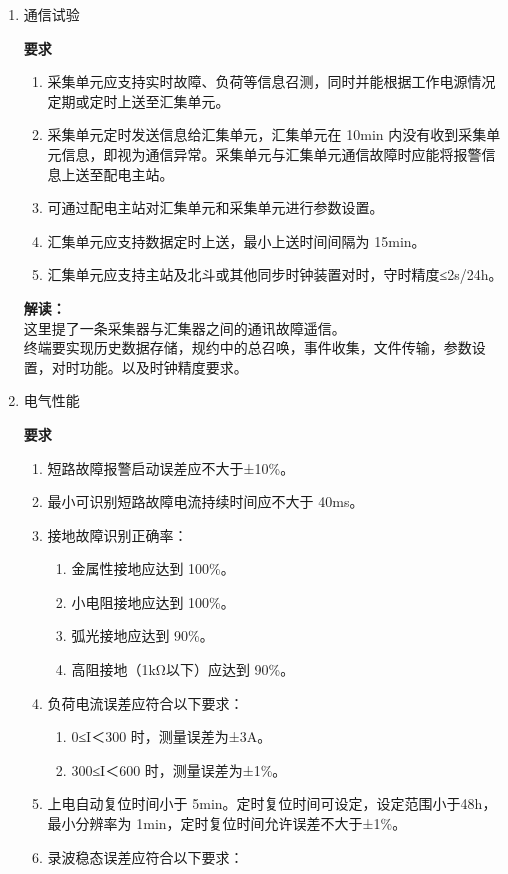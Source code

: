 \documentclass{article}
\begin{document}
\begin{CJK}{UTF8}{gbsn}
\begin{enumerate}
	\item 通信试验 
		\par
		\textbf{要求}
		\begin{enumerate}
		\item 采集单元应支持实时故障、负荷等信息召测，同时并能根据工作电源情况定期或定时上送至汇集单元。 
		\item 采集单元定时发送信息给汇集单元，汇集单元在 10min 内没有收到采集单元信息，即视为通信异常。采集单元与汇集单元通信故障时应能将报警信息上送至配电主站。 
		\item 可通过配电主站对汇集单元和采集单元进行参数设置。 
		\item 汇集单元应支持数据定时上送，最小上送时间间隔为 15min。 
		\item 汇集单元应支持主站及北斗或其他同步时钟装置对时，守时精度≤2s/24h。		
		\end{enumerate}
		\textbf{解读：}\\
		这里提了一条采集器与汇集器之间的通讯故障遥信。\\
		终端要实现历史数据存储，规约中的总召唤，事件收集，文件传输，参数设置，对时功能。以及时钟精度要求。
	\item 电气性能		
		\par
		\textbf{要求}
			\begin{enumerate}
				\item 短路故障报警启动误差应不大于±10\%。 
				\item 最小可识别短路故障电流持续时间应不大于 40ms。 
				\item 接地故障识别正确率： 
					\begin{enumerate}
						\item 金属性接地应达到 100\%。 
				    	\item 小电阻接地应达到 100\%。 
				    	\item 弧光接地应达到 90\%。 
				    	\item 高阻接地（1kΩ以下）应达到 90\%。 
					\end{enumerate}
				\item 负荷电流误差应符合以下要求：
					\begin{enumerate}
						\item  0≤I＜300 时，测量误差为±3A。 
				    	\item 300≤I＜600 时，测量误差为±1\%。 
					\end{enumerate}
				\item 上电自动复位时间小于 5min。定时复位时间可设定，设定范围小于48h，最小分辨率为 1min，定时复位时间允许误差不大于±1\%。 
				\item 录波稳态误差应符合以下要求： 

\end{enumerate}
\end{enumerate}
\end{CJK}
\end{document}
